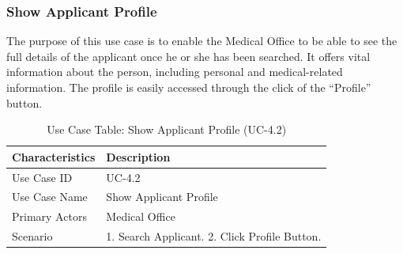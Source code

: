 \subsubsection{Show Applicant Profile}
The purpose of this use case is to enable the Medical Office to be able to see the full details of the applicant once he or she has been searched. It offers vital information about the person, including personal and medical-related information. The profile is easily accessed through the click of the “Profile” button.
\begin{table}[H]
    \centering
    \small
    \renewcommand{\arraystretch}{1.4}
    \caption{Use Case Table: Show Applicant Profile (UC-4.2)} %
    \label{tab:show-applicant-profile}
    \begin{tabularx}{\textwidth}{|l|X|}
        \hline
        \rowcolor[gray]{0.9} {Characteristics} & {Description} \\ \hline
        Use Case ID & UC-4.2 \\ \hline
        Use Case Name & Show Applicant Profile \\ \hline
        Primary Actors & Medical Office \\ \hline
        Scenario & 1. Search Applicant. 2. Click Profile Button. \\ \hline
    \end{tabularx}
\end{table}
\FloatBarrier